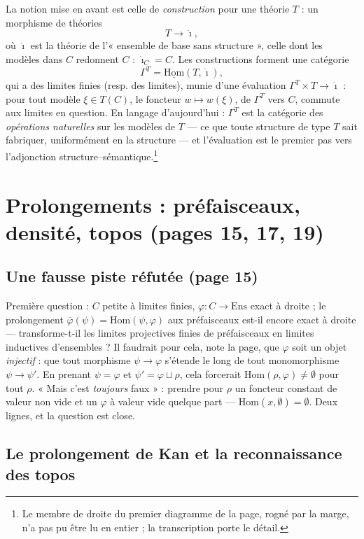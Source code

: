 \documentclass[11pt,a4paper]{article}
\begin{document}
La notion mise en avant est celle de \emph{construction} pour une théorie
$T$ : un morphisme de théories
\[
T \longrightarrow \dot{\imath},
\]
où $\dot{\imath}$ est la théorie de l'« ensemble de base sans structure »,
celle dont les modèles dans $C$ redonnent $C$ : $\dot{\imath}_C = C$. Les
constructions forment une catégorie
\[
\Gamma^{T} = \underline{\mathrm{Hom}}(T, \dot{\imath}),
\]
qui a des limites finies (resp. des limites), munie d'une évaluation
$\Gamma^{T} \times T \to \dot{\imath}$ : pour tout modèle $\xi \in T(C)$,
le foncteur $w \mapsto w(\xi)$, de $\Gamma^{T}$ vers $C$, commute aux
limites en question. En langage d'aujourd'hui : $\Gamma^{T}$ est la
catégorie des \emph{opérations naturelles} sur les modèles de $T$ — ce que
toute structure de type $T$ sait fabriquer, uniformément en la structure —
et l'évaluation est le premier pas vers l'adjonction
structure--sémantique.\footnote{Le membre de droite du premier diagramme de la page, rogné par la marge, n'a pas pu être lu en entier ; la
transcription porte le détail.}

\section*{Prolongements : préfaisceaux, densité, topos (pages 15, 17, 19)}

\subsection*{Une fausse piste réfutée (page 15)}

Première question : $C$ petite à limites finies,
$\varphi : C \to \mathrm{Ens}$ exact à droite ; le prolongement
$\overline{\varphi}(\psi) = \mathrm{Hom}(\psi, \varphi)$ aux préfaisceaux
est-il encore exact à droite — transforme-t-il les limites projectives
finies de préfaisceaux en limites inductives d'ensembles ? Il faudrait pour
cela, note la page, que $\varphi$ soit un objet \emph{injectif} : que
tout morphisme $\psi \to \varphi$ s'étende le long de tout monomorphisme
$\psi \to \psi'$. En prenant $\psi = \varphi$ et
$\psi' = \varphi \sqcup \rho$, cela forcerait
$\mathrm{Hom}(\rho, \varphi) \neq \emptyset$ pour tout $\rho$. « Mais c'est
\emph{toujours} faux » : prendre pour $\rho$ un foncteur constant de valeur
non vide et un $\varphi$ à valeur vide quelque part —
$\mathrm{Hom}(x, \emptyset) = \emptyset$. Deux lignes, et la question est
close.

\subsection*{Le prolongement de Kan et la reconnaissance des topos}
\end{document}
